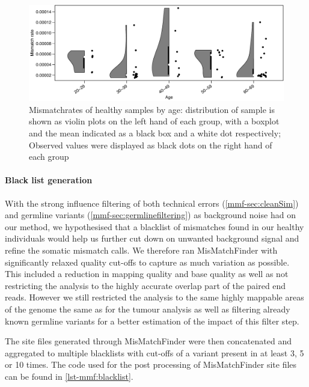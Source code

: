 \begin{figure}[ht]
\centering
\includegraphics[width=.99\linewidth]{Figures/MisMatchFinder/MisMatchRateByAge.pdf}
\caption[Mismatchrates of healthy samples by age]{Mismatchrates of healthy samples by age: distribution of sample is shown as violin plots on the left hand of each group, with a boxplot and the mean indicated as a black box and a white dot respectively; Observed values were displayed as black dots on the right hand of each group}\label{fig:mmf-mmrByAge}
\end{figure}


\paragraph{Black list generation}
\label{mmf-sec:healthyBlacklist}
With the strong influence filtering of both technical errors (\autoref{mmf-sec:cleanSim}) and germline variants (\autoref{mmf-sec:germlinefiltering})  as background noise had on our method, we hypothesised that a blacklist of mismatches found in our healthy individuals would help us further cut down on unwanted background signal and refine the somatic mismatch calls. We therefore ran MisMatchFinder with significantly relaxed quality cut-offs to capture as much variation as possible. This included a reduction in mapping quality and base quality as well as not restricting the analysis to the highly accurate overlap part of the paired end reads. However we still restricted the analysis to the same highly mappable areas of the genome the same as for the tumour analysis as well as filtering already known germline variants for a better estimation of the impact of this filter step.

The site files generated through MisMatchFinder were then concatenated and aggregated to multiple blacklists with cut-offs of a variant present in at least 3, 5 or 10 times. The code used for the post processing of MisMatchFinder site files can be found in \autoref{lst-mmf:blacklist}.


